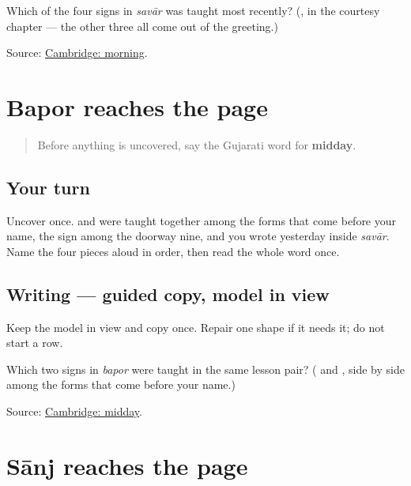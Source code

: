 \begin{tcolorbox}[breakable,colback=teal!4,colframe=teal!35!black,title={Before you move on}]
Which of the four signs in \emph{savār} was taught most recently? (\textbf{}, in the courtesy chapter — the other three all come out of the greeting.)

Source: \href{https://dictionary.cambridge.org/dictionary/english-gujarati/morning}{Cambridge: morning}.
\end{tcolorbox}
\section[Practice]{Bapor reaches the page}

\label{lesson:GU-C25-bapor}



\begin{quote}
Before anything is uncovered, say the Gujarati word for \textbf{midday}.
\end{quote}

\subsection*{Your turn}
Uncover \textbf{} once. \textbf{} and \textbf{} were taught together among the forms that come before your name, the \textbf{} sign among the doorway nine, and \textbf{} you wrote yesterday inside \emph{savār}. Name the four pieces aloud in order, then read the whole word once.

\subsection*{Writing — guided copy, model in view}
Keep the model in view and copy \textbf{} once. Repair one shape if it needs it; do not start a row.

\begin{tcolorbox}[breakable,colback=teal!4,colframe=teal!35!black,title={Before you move on}]
Which two signs in \emph{bapor} were taught in the same lesson pair? (\textbf{} and \textbf{}, side by side among the forms that come before your name.)

Source: \href{https://dictionary.cambridge.org/dictionary/english-gujarati/afternoon}{Cambridge: midday}.
\end{tcolorbox}
\section[Practice]{Sānj reaches the page}

